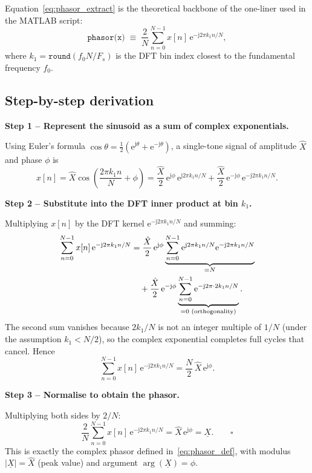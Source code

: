 \documentclass[11pt,a4paper]{article}
\newcommand{\jj}{\mathrm{j}}          %
\newcommand{\e}{\mathrm{e}}           %
\begin{document}
Equation~\eqref{eq:phasor_extract} is the theoretical backbone of the
one-liner used in the MATLAB script:
\begin{equation}
  \texttt{phasor(x)} \;\equiv\;
  \frac{2}{N}\sum_{n=0}^{N-1} x[n]\,\e^{-\jj 2\pi k_1 n/N},
  \label{eq:phasor_matlab}
\end{equation}
where $k_1 = \texttt{round}(f_0 N / F_s)$ is the DFT bin index closest to the
fundamental frequency $f_0$.

\subsection*{Step-by-step derivation}

\noindent\textbf{Step 1 – Represent the sinusoid as a sum of complex
exponentials.}

Using Euler's formula $\cos\theta = \tfrac{1}{2}(\e^{\jj\theta}+\e^{-\jj\theta})$,
a single-tone signal of amplitude $\hat{X}$ and phase $\phi$ is
\begin{equation}
  x[n] = \hat{X}\cos\!\left(\frac{2\pi k_1 n}{N}+\phi\right)
       = \frac{\hat{X}}{2}\,\e^{\jj\phi}\,\e^{\jj 2\pi k_1 n/N}
       + \frac{\hat{X}}{2}\,\e^{-\jj\phi}\,\e^{-\jj 2\pi k_1 n/N}.
  \label{eq:euler}
\end{equation}

\noindent\textbf{Step 2 – Substitute into the DFT inner product at bin $k_1$.}

Multiplying $x[n]$ by the DFT kernel $\e^{-\jj 2\pi k_1 n/N}$ and summing:
\begin{align}
  \sum_{n=0}^{N-1} x[n]\,\e^{-\jj 2\pi k_1 n/N}
  &= \frac{\hat{X}}{2}\,\e^{\jj\phi}
     \underbrace{\sum_{n=0}^{N-1}\e^{\jj 2\pi k_1 n/N}\e^{-\jj 2\pi k_1 n/N}}_{= N}
  \notag\\
  &\quad + \frac{\hat{X}}{2}\,\e^{-\jj\phi}
     \underbrace{\sum_{n=0}^{N-1}\e^{-\jj 2\pi \cdot 2k_1 n/N}}_{= 0\text{ (orthogonality)}}.
  \label{eq:inner}
\end{align}
The second sum vanishes because $2k_1/N$ is not an integer multiple of $1/N$
(under the assumption $k_1 < N/2$), so the complex exponential completes full
cycles that cancel.  Hence
\begin{equation}
  \sum_{n=0}^{N-1} x[n]\,\e^{-\jj 2\pi k_1 n/N}
  = \frac{N}{2}\,\hat{X}\,\e^{\jj\phi}.
  \label{eq:inner_result}
\end{equation}

\noindent\textbf{Step 3 – Normalise to obtain the phasor.}

Multiplying both sides by $2/N$:
\begin{equation}
  \frac{2}{N}\sum_{n=0}^{N-1} x[n]\,\e^{-\jj 2\pi k_1 n/N}
  = \hat{X}\,\e^{\jj\phi} = \underline{X}. \qquad \square
  \label{eq:result}
\end{equation}
This is exactly the complex phasor defined in~\eqref{eq:phasor_def}, with
modulus $|\underline{X}| = \hat{X}$ (peak value) and argument
$\arg(\underline{X}) = \phi$.
\end{document}
